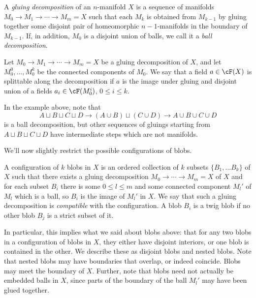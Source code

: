\begin{defn}
\label{defn:gluing-decomposition}
A \emph{gluing decomposition} of an $n$-manifold $X$ is a sequence of manifolds 
$M_0 \to M_1 \to \cdots \to M_m = X$ such that each $M_k$ is obtained from $M_{k-1}$ 
by gluing together some disjoint pair of homeomorphic $n{-}1$-manifolds in the boundary of $M_{k-1}$.
If, in addition, $M_0$ is a disjoint union of balls, we call it a \emph{ball decomposition}.
\end{defn}

Let $M_0 \to M_1 \to \cdots \to M_m = X$ be a gluing decomposition of $X$, 
and let $M_0^0,\ldots,M_0^k$ be the connected components of $M_0$.
We say that a field 
$a\in \cF(X)$ is splittable along the decomposition if $a$ is the image 
under gluing and disjoint union of a fields $a_i \in \cF(M_0^i)$, $0\le i\le k$.

In the example above, note that
\[
	A \sqcup B \sqcup C \sqcup D \to (A \cup B) \sqcup (C \cup D) \to A \cup B \cup C \cup D
\]
is a  ball decomposition, but other sequences of gluings starting from $A \sqcup B \sqcup C \sqcup D$
have intermediate steps which are not manifolds.

We'll now slightly restrict the possible configurations of blobs.
\begin{defn}
\label{defn:configuration}
A configuration of $k$ blobs in $X$ is an ordered collection of $k$ subsets $\{B_1, \ldots B_k\}$ 
of $X$ such that there exists a gluing decomposition $M_0  \to \cdots \to M_m = X$ of $X$ and 
for each subset $B_i$ there is some $0 \leq l \leq m$ and some connected component $M_l'$ of 
$M_l$ which is a ball, so $B_i$ is the image of $M_l'$ in $X$. 
We say that such a gluing decomposition 
is \emph{compatible} with the configuration. 
A blob $B_i$ is a twig blob if no other blob $B_j$ is a strict subset of it. 
\end{defn}
In particular, this implies what we said about blobs above: 
that for any two blobs in a configuration of blobs in $X$, 
they either have disjoint interiors, or one blob is contained in the other. 
We describe these as disjoint blobs and nested blobs. 
Note that nested blobs may have boundaries that overlap, or indeed coincide. 
Blobs may meet the boundary of $X$.
Further, note that blobs need not actually be embedded balls in $X$, since parts of the 
boundary of the ball $M_l'$ may have been glued together.


